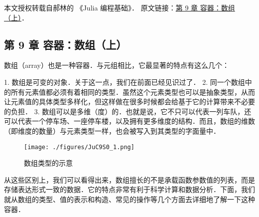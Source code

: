 
本文授权转载自郝林的 《Julia 编程基础》． 原文链接：\href{https://github.com/hyper0x/JuliaBasics/blob/master/book/ch09.md}{第 9 章 容器：数组（上）}．


\subsection{第 9 章 容器：数组（上）}

数组（array）也是一种容器．与元组相比，它最显著的特点有这么几个：

1. 数组是可变的对象．关于这一点，我们在前面已经见识过了．
2. 同一个数组中的所有元素值都必须有着相同的类型．虽然这个元素类型也可以是抽象类型，从而让元素值的具体类型多样化，但这样做在很多时候都会给基于它的计算带来不必要的负担．
3. 数组可以是多维（度）的．也就是说，它不只可以代表一列车队，还可以代表一个停车场、一座停车楼，以及拥有更多维度的结构．而且，数组的维数（即维度的数量）与元素类型一样，也会被写入到其类型的字面量中．

\begin{figure}[ht]
\centering
\texttt{[image: ./figures/JuC9S0\_1.png]}
\caption{数组类型的示意} \label{JuC9S0_fig1}
\end{figure}

从这些区别上，我们可以看得出来，数组擅长的不是承载函数参数值的列表，而是存储表达形式一致的数据．它的特点非常有利于科学计算和数据分析．下面，我们就从数组的类型、值的表示和构造、常见的操作等几个方面去详细地了解一下这种容器．